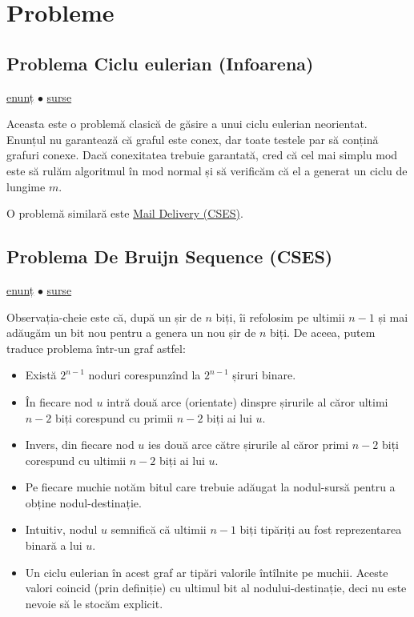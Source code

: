 \documentclass[../main.tex]{subfiles}
\begin{document}
\section{Probleme}

\subsection{Problema Ciclu eulerian (Infoarena)}
\label{problem:ciclu-eulerian}

\href{https://www.infoarena.ro/problema/ciclueuler}{enunț}
$\bullet$
\hyperref[code:ciclu-eulerian]{surse}

Aceasta este o problemă clasică de găsire a unui ciclu eulerian neorientat. Enunțul nu garantează că graful este conex, dar toate testele par să conțină grafuri conexe. Dacă conexitatea trebuie garantată, cred că cel mai simplu mod este să rulăm algoritmul în mod normal și să verificăm că el a generat un ciclu de lungime $m$.

O problemă similară este \href{https://cses.fi/problemset/task/1691}{Mail Delivery (CSES)}.

\subsection{Problema De Bruijn Sequence (CSES)}
\label{problem:de-bruijn-sequence}

\href{https://cses.fi/problemset/task/1692}{enunț}
$\bullet$
\hyperref[code:de-bruijn-sequence]{surse}

Observația-cheie este că, după un șir de $n$ biți, îi refolosim pe ultimii $n-1$ și mai adăugăm un bit nou pentru a genera un nou șir de $n$ biți. De aceea, putem traduce problema într-un graf astfel:

\begin{itemize}
  \item Există $2^{n-1}$ noduri corespunzînd la $2^{n-1}$ șiruri binare.
  \item În fiecare nod $u$ intră două arce (orientate) dinspre șirurile al căror ultimi $n-2$ biți corespund cu primii $n-2$ biți ai lui $u$.
  \item Invers, din fiecare nod $u$ ies două arce către șirurile al căror primi $n-2$ biți corespund cu ultimii $n-2$ biți ai lui $u$.
  \item Pe fiecare muchie notăm bitul care trebuie adăugat la nodul-sursă pentru a obține nodul-destinație.
  \item Intuitiv, nodul $u$ semnifică că ultimii $n-1$ biți tipăriți au fost reprezentarea binară a lui $u$.
  \item Un ciclu eulerian în acest graf ar tipări valorile întîlnite pe muchii. Aceste valori coincid (prin definiție) cu ultimul bit al nodului-destinație, deci nu este nevoie să le stocăm explicit.
\end{itemize}
\end{document}
